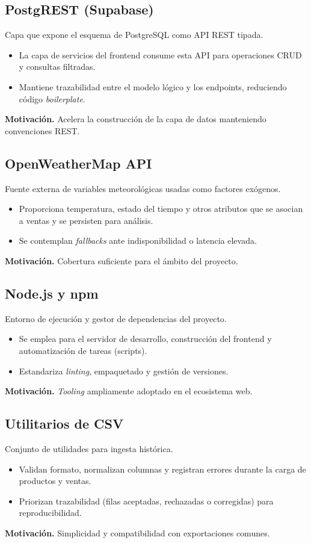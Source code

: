 \subsection{PostgREST (Supabase)}
Capa que expone el esquema de PostgreSQL como API REST tipada.
\begin{itemize}
    \item La capa de servicios del frontend consume esta API para operaciones CRUD y consultas filtradas.
    \item Mantiene trazabilidad entre el modelo lógico y los endpoints, reduciendo código \textit{boilerplate}.
\end{itemize}
\noindent\textbf{Motivación.} Acelera la construcción de la capa de datos manteniendo convenciones REST.

\subsection{OpenWeatherMap API}
Fuente externa de variables meteorológicas usadas como factores exógenos.
\begin{itemize}
    \item Proporciona temperatura, estado del tiempo y otros atributos que se asocian a ventas y se persisten para análisis.
    \item Se contemplan \textit{fallbacks} ante indisponibilidad o latencia elevada.
\end{itemize}
\noindent\textbf{Motivación.} Cobertura suficiente para el ámbito del proyecto.

\subsection{Node.js y npm}
Entorno de ejecución y gestor de dependencias del proyecto.
\begin{itemize}
    \item Se emplea para el servidor de desarrollo, construcción del frontend y automatización de tareas (scripts).
    \item Estandariza \textit{linting}, empaquetado y gestión de versiones.
\end{itemize}
\noindent\textbf{Motivación.} \textit{Tooling} ampliamente adoptado en el ecosistema web.

\subsection{Utilitarios de CSV}
Conjunto de utilidades para ingesta histórica.
\begin{itemize}
    \item Validan formato, normalizan columnas y registran errores durante la carga de productos y ventas.
    \item Priorizan trazabilidad (filas aceptadas, rechazadas o corregidas) para reproducibilidad.
\end{itemize}
\noindent\textbf{Motivación.} Simplicidad y compatibilidad con exportaciones comunes.

